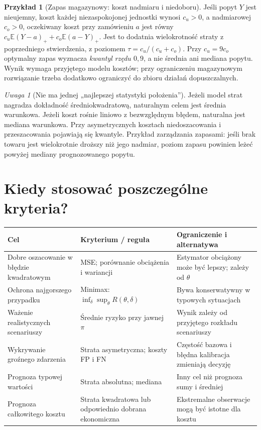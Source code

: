 \documentclass[11pt,a4paper,oneside]{report}
\numberwithin{equation}{chapter}
\theoremstyle{plain}
\theoremstyle{definition}
\newtheorem{przyklad}{Przykład}[chapter]
\theoremstyle{remark}
\newtheorem{uwaga}{Uwaga}[chapter]
\newcommand{\E}{\mathbb E}
\begin{document}
\begin{przyklad}[Zapas magazynowy: koszt nadmiaru i niedoboru]
Jeśli popyt $Y$ jest nieujemny, koszt każdej niezaspokojonej
jednostki wynosi $c_u>0$, a nadmiarowej $c_o>0$, oczekiwany koszt
przy zamówieniu $a$ jest równy
$c_u\E(Y-a)_++c_o\E(a-Y)_+$. Jest to dodatnia wielokrotność
straty z poprzedniego stwierdzenia, z poziomem
$\tau=c_u/(c_u+c_o)$. Przy $c_u=9c_o$ optymalny zapas wyznacza
\emph{kwantyl rzędu $0{,}9$}, a nie średnia ani mediana popytu.
Wynik wymaga przyjętego modelu kosztów; przy ograniczeniu
magazynowym rozwiązanie trzeba dodatkowo ograniczyć do
zbioru działań dopuszczalnych.
\end{przyklad}

\begin{uwaga}[Nie ma jednej „najlepszej statystyki położenia”]
Jeżeli model strat nagradza dokładność średniokwadratową, naturalnym
celem jest średnia warunkowa. Jeżeli koszt rośnie liniowo z
bezwzględnym błędem, naturalna jest mediana warunkowa.
Przy asymetrycznych kosztach niedoszacowania i przeszacowania
pojawiają się kwantyle. Przykład zarządzania zapasami: jeśli brak
towaru jest wielokrotnie droższy niż jego nadmiar, poziom zapasu
powinien leżeć powyżej mediany prognozowanego popytu.
\end{uwaga}

\section{Kiedy stosować poszczególne kryteria?}
\begin{center}\small
\begin{tabular}{>{\raggedright\arraybackslash}p{}>{\raggedright\arraybackslash}p{}>{\raggedright\arraybackslash}p{}}
\toprule
\textbf{Cel} & \textbf{Kryterium / reguła} & \textbf{Ograniczenie i alternatywa}\\
\midrule
Dobre oszacowanie w błędzie kwadratowym & MSE; porównanie obciążenia i wariancji & Estymator obciążony może być lepszy; zależy od $\theta$\\
Ochrona najgorszego przypadku & Minimax: $\inf_\delta\sup_\theta R(\theta,\delta)$ & Bywa konserwatywny w typowych sytuacjach\\
Ważenie realistycznych scenariuszy & Średnie ryzyko przy jawnej $\pi$ & Wynik zależy od przyjętego rozkładu scenariuszy\\
Wykrywanie groźnego zdarzenia & Strata asymetryczna; koszty FP i FN & Częstość bazowa i błędna kalibracja zmieniają decyzję\\
Prognoza typowej wartości & Strata absolutna; mediana & Inny cel niż prognoza sumy i średniej\\
Prognoza całkowitego kosztu & Strata kwadratowa lub odpowiednio dobrana ekonomiczna & Ekstremalne obserwacje mogą być istotne dla kosztu\\
\bottomrule
\end{tabular}
\end{center}
\end{document}
